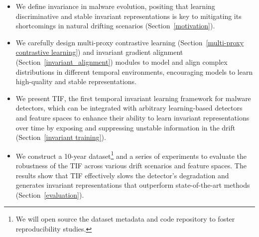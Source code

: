 \begin{itemize}
    \item We define invariance in malware evolution, positing that learning discriminative and stable invariant representations is key to mitigating its shortcomings in natural drifting scenarios (Section~\ref{motivation}).
    \item We carefully design multi-proxy contrastive learning (Section~\ref{multi-proxy contrastive learning}) and invariant gradient alignment (Section~\ref{invariant_alignment}) modules to model and align complex distributions in different temporal environments, encouraging models to learn high-quality and stable representations.
    \item We present TIF, the first temporal invariant learning framework for malware detectors, which can be integrated with arbitrary learning-based detectors and feature spaces to enhance their ability to learn invariant representations over time by exposing and suppressing unstable information in the drift (Section~\ref{invariant training}).
    \item We construct a 10-year dataset\footnote{We will open source the dataset metadata and code repository to foster reproducibility studies.} and a series of experiments to evaluate the robustness of the TIF across various drift scenarios and feature spaces. The results show that TIF effectively slows the detector's degradation and generates invariant representations that outperform state-of-the-art methods (Section~\ref{evaluation}).
\end{itemize}


